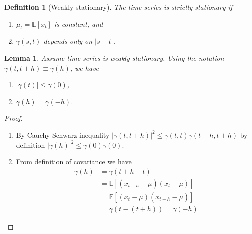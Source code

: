 \documentclass[10pt,titlepage,oneside,openany]{report}
\theoremstyle{remark}
\theoremstyle{plain}
\newtheorem{Lemma}{Lemma}[section]
\newtheorem{Definition}{Definition}[section]
\numberwithin{equation}{section}
\renewcommand{\leq}{\leqslant}
\begin{document}
\begin{Definition}[Weakly stationary]
	The time series is strictly stationary if
	\begin{enumerate}
		\item $\mu_t = \mathds{E}[x_t]$ is constant, and
		
		\item $\gamma(s,t)$ depends only on $|s-t|$. 
	\end{enumerate}
\end{Definition}


\begin{Lemma}
	Assume time series is weakly stationary. Using the notation $\gamma (t, t+h) \equiv \gamma (h)$, we have
	\begin{enumerate}
		\item $|\gamma (t)| \leq \gamma(0)$,
		
		\item $\gamma(h) = \gamma(-h)$.
	\end{enumerate}
\end{Lemma}

\begin{proof}
	\begin{enumerate}
		\item By Cauchy-Schwarz inequality $|\gamma (t, t+h)|^2 \leq \gamma(t,t) \gamma(t+h,t+h)$ by definition $|\gamma(h)|^2 \leq \gamma(0) \gamma(0)$.
		
		\item From definition of covariance we have
		\begin{align*} 
			\gamma(h) &= \gamma(t+h-t)\\
			& = \mathds{E}\left[(x_{t+h}-\mu)(x_t - \mu)\right]\\
			& = \mathds{E}\left[(x_t - \mu)(x_{t+h}-\mu)\right]\\
			& = \gamma(t-(t+h)) = \gamma(-h)
		\end{align*}
	\end{enumerate}
\end{proof}
\end{document}
